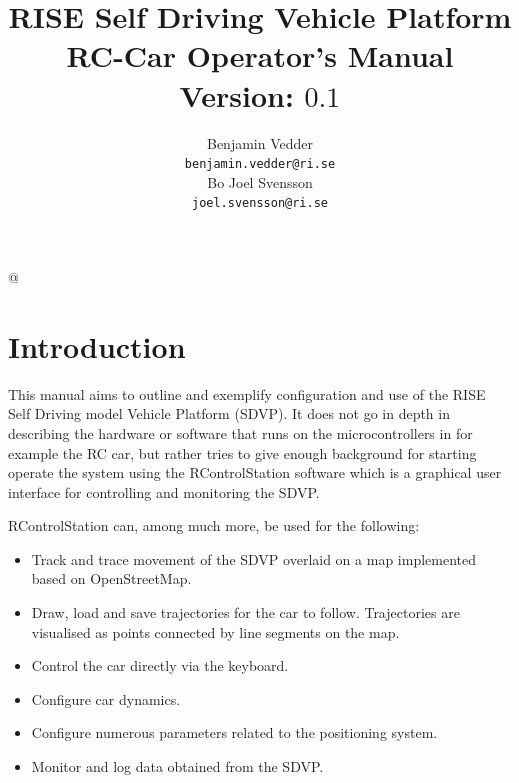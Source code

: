 \documentclass[12pt]{article} %
\makeatletter
\renewcommand{\maketitle}{\bgroup\setlength{\parindent}{0pt}
  \thispagestyle{empty}
  \begin{flushleft}
    \textbf{\@title}

    \vspace{3cm}
    
    \@author
    
    \begin{center}
    \end{center}
      
  \end{flushleft}\egroup
}
\newcommand{\GUIDEVERSION}[0]{$0.1$}
\newcommand{\GUIDETITLE}[0]{RISE Self Driving Vehicle Platform \newline \noindent
  RC-Car Operator's Manual \newline \noindent Version: \GUIDEVERSION{}}
\makeatother
\begin{document}
\title{\GUIDETITLE}


\author{Benjamin Vedder\\ \texttt{benjamin.vedder@ri.se}\\ \vspace{5mm} Bo Joel Svensson\\ \texttt{joel.svensson@ri.se}} 

\lstMakeShortInline[]@

\maketitle



\newpage
\tableofcontents{}
\newpage


\section{Introduction}

This manual aims to outline and exemplify configuration and use of the
RISE Self Driving model Vehicle Platform (SDVP). It does not go in
depth in describing the hardware or software that runs on the
microcontrollers in for example the RC car, but rather tries to give
enough background for starting operate the system using the
RControlStation software which is a graphical user interface for
controlling and monitoring the SDVP.

RControlStation can, among much more, be used for the following:
\begin{itemize}
\item Track and trace movement of the SDVP overlaid on a map
  implemented based on OpenStreetMap.
\item Draw, load and save trajectories for the car to
  follow. Trajectories are visualised as points connected by line
  segments on the map.
\item Control the car directly via the keyboard.
\item Configure car dynamics.
\item Configure numerous parameters related to the positioning system.
\item Monitor and log data obtained from the SDVP. 
\end{itemize} 
\end{document}
